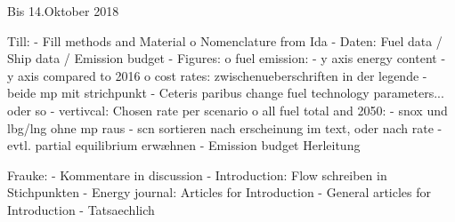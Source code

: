 Bis 14.Oktober 2018

Till:
- Fill methods and Material
    o   Nomenclature from Ida
- Daten: Fuel data / Ship data / Emission budget
- Figures:
    o   fuel emission:
        - y axis energy content
        - y axis compared to 2016
    o   cost rates: zwischenueberschriften in der legende
        - beide mp mit strichpunkt
        - Ceteris paribus change fuel technology parameters... oder so
        - vertivcal: Chosen rate per scenario
    o   all fuel total and 2050:
        - snox und lbg/lng ohne mp raus
        - scn sortieren nach erscheinung im text, oder nach rate
- evtl. partial equilibrium erwæhnen
- Emission budget Herleitung

Frauke:
- Kommentare in discussion
- Introduction: Flow schreiben in Stichpunkten
- Energy journal: Articles for Introduction
- General articles for Introduction
- Tatsaechlich


